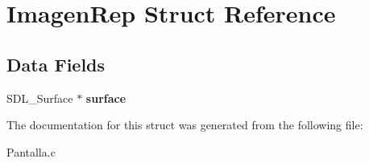 \hypertarget{struct_imagen_rep}{}\section{Imagen\+Rep Struct Reference}
\label{struct_imagen_rep}
\subsection*{Data Fields}
\begin{DoxyCompactItemize}
\item 
\mbox{\label{struct_imagen_rep_a79a49c614b36759e76181569e02d49ed}} 
S\+D\+L\+\_\+\+Surface $\ast$ {\bfseries surface}
\end{DoxyCompactItemize}


The documentation for this struct was generated from the following file\+:\begin{DoxyCompactItemize}
\item 
Pantalla.\+c\end{DoxyCompactItemize}
